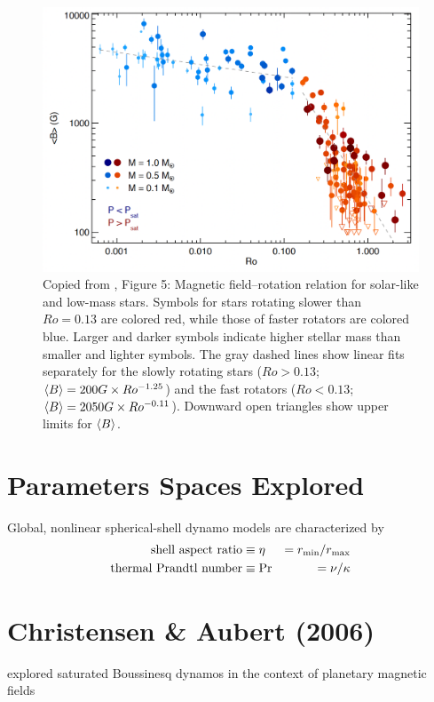 \documentclass[12pt]{article} %
\begin{document}
\begin{figure}\label{fig:arr}
	\centering
	\includegraphics[width=6.5in]{ARR.png}
	\caption{Copied from \citet{Reiners2022}, Figure 5: Magnetic field–rotation relation for solar-like and low-mass stars. Symbols for stars rotating slower than $Ro=0.13$ are colored red, while those of faster rotators are colored blue. Larger and darker symbols indicate higher stellar mass than smaller and lighter symbols.  The gray dashed lines show linear fits separately for the slowly rotating stars ($Ro>0.13$;  $\left\langle B\right\rangle=200G\times Ro^{-1.25}$) and the fast rotators ($Ro<0.13$; $\left\langle B\right\rangle=2050 G \times Ro^{-0.11}$). Downward open triangles show upper limits for $\left\langle B\right\rangle$.}
\end{figure}

\section{Parameters  Spaces Explored}
Global, nonlinear spherical-shell dynamo models are characterized by 
\begin{align}
	\text{shell aspect ratio}&\equiv \eta &=r_{\rm{min}}/r_{\rm{max}}\\
	\text{thermal Prandtl number}&\equiv\text{Pr}&=\nu/\kappa
\end{align}
\section{Christensen \& Aubert (2006)}
\citet{Christensen2006} explored saturated Boussinesq dynamos in the context of planetary magnetic fields 

	

\end{document}
